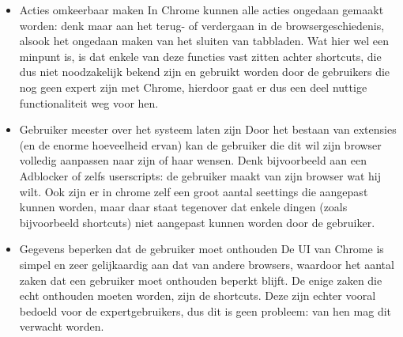 \documentclass[12pt]{article}
\begin{document}
\begin{itemize}
	\item Acties omkeerbaar maken
	\newline
	In Chrome kunnen alle acties ongedaan gemaakt worden: denk maar aan het terug- of verdergaan in de browsergeschiedenis, alsook het ongedaan maken van het sluiten van tabbladen. Wat hier wel een minpunt is, is dat enkele van deze functies vast zitten achter shortcuts, die dus niet noodzakelijk bekend zijn en gebruikt worden door de gebruikers die nog geen expert zijn met Chrome, hierdoor gaat er dus een deel nuttige functionaliteit weg voor hen.
	\item Gebruiker meester over het systeem laten zijn
	\newline
	Door het bestaan van extensies (en de enorme hoeveelheid ervan\cite{extensions}) kan de gebruiker die dit wil zijn browser volledig aanpassen naar zijn of haar wensen. Denk bijvoorbeeld aan een Adblocker of zelfs userscripts: de gebruiker maakt van zijn browser wat hij wilt. Ook zijn er in chrome zelf een groot aantal seettings die aangepast kunnen worden, maar daar staat tegenover dat enkele dingen (zoals bijvoorbeeld shortcuts) niet aangepast kunnen worden door de gebruiker.
	\item Gegevens beperken dat de gebruiker moet onthouden
	\newline
	De UI van Chrome is simpel en zeer gelijkaardig aan dat van andere browsers, waardoor het aantal zaken dat een gebruiker moet onthouden beperkt blijft. De enige zaken die echt onthouden moeten worden, zijn de shortcuts. Deze zijn echter vooral bedoeld voor de expertgebruikers, dus dit is geen probleem: van hen mag dit verwacht worden.
\end{itemize}
\newpage


\newpage
\end{document}
